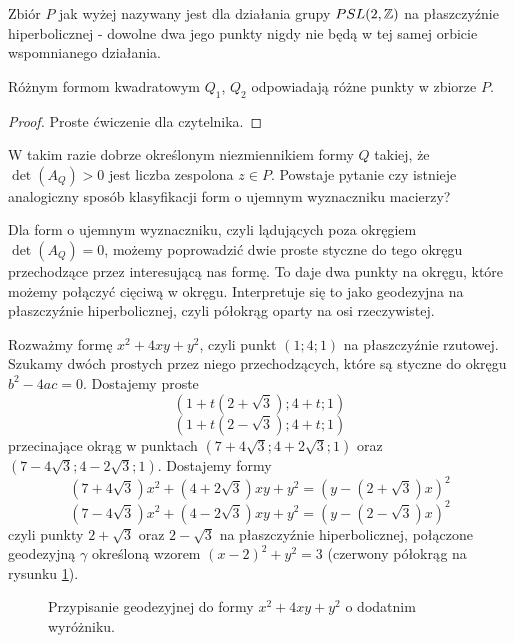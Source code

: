 \documentclass[a4paper, 12pt]{article}
\begin{document}
Zbiór $P$ jak wyżej nazywany jest  dla działania grupy $PSL(2,\mathbb{Z})$ na płaszczyźnie hiperbolicznej - dowolne dwa jego punkty nigdy nie będą w tej samej orbicie wspomnianego działania.

\begin{lemma}
  Różnym formom kwadratowym $Q_1$, $Q_2$ odpowiadają różne punkty w zbiorze $P$.
\end{lemma}

\begin{proof}
  \color{red}Proste ćwiczenie dla czytelnika.
\end{proof}

W takim razie dobrze określonym niezmiennikiem formy $Q$ takiej, że $\det(A_Q)>0$ jest liczba zespolona $z\in P$. Powstaje pytanie czy istnieje analogiczny sposób klasyfikacji form o ujemnym wyznaczniku macierzy?

Dla form o ujemnym wyznaczniku, czyli lądujących poza okręgiem $\det(A_Q)=0$, możemy poprowadzić dwie proste styczne do tego okręgu przechodzące przez interesującą nas formę. To daje dwa punkty na okręgu, które możemy połączyć cięciwą w okręgu. Interpretuje się to jako geodezyjna na płaszczyźnie hiperbolicznej, czyli półokrąg oparty na osi rzeczywistej.

\begin{example}
  Rozważmy formę $x^2+4xy+y^2$, czyli punkt $(1;4;1)$ na płaszczyźnie rzutowej. Szukamy dwóch prostych przez niego przechodzących, które są styczne do okręgu $b^2-4ac=0$. Dostajemy proste
  $$(1+t(2+\sqrt{3});4+t;1)$$
  $$(1+t(2-\sqrt{3});4+t;1)$$
  przecinające okrąg w punktach $(7+4\sqrt{3};4+2\sqrt{3};1)$ oraz $(7-4\sqrt{3};4-2\sqrt{3};1)$. Dostajemy formy
  $$(7+4\sqrt{3})x^2+(4+2\sqrt{3})xy+y^2=(y-(2+\sqrt{3})x)^2$$
  $$(7-4\sqrt{3})x^2+(4-2\sqrt{3})xy+y^2=(y-(2-\sqrt{3})x)^2$$
  czyli punkty $2+\sqrt{3}$ oraz $2-\sqrt{3}$ na płaszczyźnie hiperbolicznej, połączone geodezyjną $\gamma$ określoną wzorem $(x-2)^2+y^2=3$ (czerwony półokrąg na rysunku \ref{przyklad 1}). 
  \begin{figure}[h]\centering
    \caption{Przypisanie geodezyjnej do formy $x^2+4xy+y^2$ o dodatnim wyróżniku.\label{przyklad 1}}
  \end{figure}
\end{example}
\end{document}
